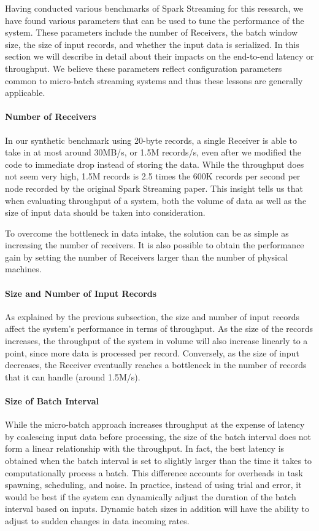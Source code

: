 Having conducted various benchmarks of Spark Streaming for this research, we have found various parameters that can be used to tune the performance of the system. These parameters include the number of Receivers, the batch window size, the size of input records, and whether the input data is serialized. In this section we will describe in detail about their impacts on the end-to-end latency or throughput. We believe these parameters reflect configuration parameters common to micro-batch streaming systems and thus these lessons are generally applicable.

\paragraph{Number of Receivers}
In our synthetic benchmark using 20-byte records, a single Receiver is able to take in at most around 30MB/s, or 1.5M records/s, even after we modified the code to immediate drop instead of storing the data. While the throughput does not seem very high, 1.5M records is 2.5 times the 600K records per second per node recorded by the original Spark Streaming paper. This insight tells us that when evaluating throughput of a system, both the volume of data as well as the size of input data should be taken into consideration.

To overcome the bottleneck in data intake, the solution can be as simple as increasing the number of receivers. It is also possible to obtain the performance gain by setting the number of Receivers larger than the number of physical machines.

\paragraph{Size and Number of Input Records}
As explained by the previous subsection, the size and number of input records affect the system's performance in terms of throughput. As the size of the records increases, the throughput of the system in volume will also increase linearly to a point, since more data is processed per record. Conversely, as the size of input decreases, the Receiver eventually reaches a bottleneck in the number of records that it can handle (around 1.5M/s).

\paragraph{Size of Batch Interval}
While the micro-batch approach increases throughput at the expense of latency by coalescing input data before processing, the size of the batch interval does not form a linear relationship with the throughput. In fact, the best latency is obtained when the batch interval is set to slightly larger than the time it takes to computationally process a batch. This difference accounts for overheads in task spawning, scheduling, and noise. In practice, instead of using trial and error, it would be best if the system can dynamically adjust the duration of the batch interval based on inputs. Dynamic batch sizes in addition will have the ability to adjust to sudden changes in data incoming rates.

